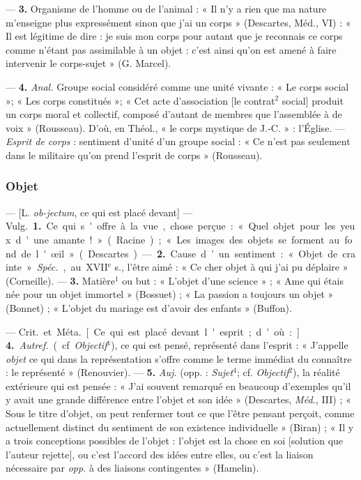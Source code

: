 — {\bf 3.} Organisme de l’homme ou
de l’animal : « Il n’y a rien que ma
nature m'enseigne plus expressément sinon que j’ai un corps » (Descartes, Méd., VI) : « Il est légitime
de dire : je suis mon corps pour
autant que je reconnais ce corps
comme n'étant pas assimilable à
un objet : c’est ainsi qu’on est amené
à faire intervenir le corps-sujet »
(G. Marcel).

— {\bf 4.} {\it Anal.} Groupe social considéré comme une unité vivante : « Le
corps social »; « Les corps constitués »; « Cet acte d'association [le
contrat$^2$ social] produit un corps
moral et collectif, composé d’autant
de membres que l’assemblée à de
voix » (Rousseau). D’où, en Théol.,
« le corps mystique de J.-C. » :
l'Église. — {\it Esprit de corps} : sentiment d'unité d’un groupe social :
« Ce n’est pas seulement dans le militaire qu'on prend l'esprit de corps »
(Rousseau).

\subsubsection{Objet}
 — [L. {\it ob-jectum}, ce qui est placé devant] — \si{Vulg.}
{\bf 1.} Ce qui s'offre à la vue, chose perçue : « Quel objet pour les yeux
d’une amante ! » (Racine) ; « Les images des objets se forment au fond de
l'œil » (Descartes). — {\bf 2.} Cause d’un sentiment : « Objet de crainte ».
{\it Spéc.}, au {\footnotesize XVII}$^\text{e}$ s., l'être aimé : « Ce cher
objet à qui j'ai pu déplaire » (Corneille). —  {\bf 3.} Matière$^1$ ou but :
« L'objet d’une science » ; « Ame qui étais née pour un objet
immortel » (Bossuet) ; « La passion a toujours un objet » (Bonnet) ;
« L'objet du mariage est d’avoir des enfants » (Buffon).

— \si{Crit.} et \si{Méta.} [Ce qui est placé devant l'esprit; d'où :]. {\bf
4.} {\it Autref.} (cf. {\it Objectif}$^1$), ce qui est pensé, représenté dans
l'esprit : « J’appelle {\it objet} ce qui dans la représentation s'offre
comme le terme immédiat du connaître : le représenté » (Renouvier). — {\bf
5.} {\it Auj.} (opp. : {\it Sujet}$^4$; cf. {\it Objectif}$^2$), la réalité
extérieure qui est pensée : « J’ai souvent remarqué en beaucoup d'exemples
qu'il y avait une grande différence entre l’objet et son idée » (Descartes,
{\it Méd.}, III) ; « Sous le titre d'objet, on peut renfermer tout ce que
l'être pensant perçoit, comme actuellement distinct du sentiment de son
existence individuelle » (Biran) ; « Il
y a trois conceptions possibles de l’objet : l'objet est la chose en soi
[solution que l’auteur rejette], ou c’est l’accord des idées entre elles, ou
c’est la liaison nécessaire par {\it opp.} à des liaisons
contingentes » (Hamelin).

